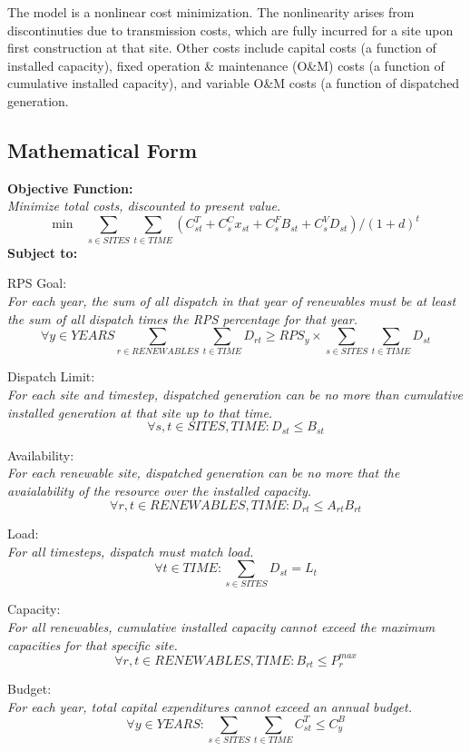 \documentclass[12pt,letterpaper,fleqn]{article}
\begin{document}
The model is a nonlinear cost minimization. The nonlinearity arises
from discontinuties due to transmission costs, which are fully
incurred for a site upon first construction at that site. Other costs
include capital costs (a function of installed capacity), fixed
operation \& maintenance (O\&M) costs (a function of cumulative
installed capacity), and variable O\&M costs (a function of dispatched
generation. 

\subsection{Mathematical Form}

\textbf{Objective Function:}\\
\emph{Minimize total costs, discounted to present value.}
  \[\text{min} \quad  \sum_{s \in SITES}\sum_{t \in TIME}(C_{st}^T + C_s^Cx_{st}
  + C_s^FB_{st} + C_s^VD_{st}) / (1 + d)^t\]
  \textbf{Subject to:}

  RPS Goal:\\
  \emph{For each year, the sum of all dispatch in that year of
    renewables must be at least the sum of all dispatch times the RPS
    percentage for that year.}
  \[\forall y \in YEARS \sum_{r \in RENEWABLES}\sum_{t \in TIME} D_{rt} \ge RPS_y \times
  \sum_{s \in SITES}\sum_{t \in TIME} D_{st}\]

  Dispatch Limit:\\
  \emph{For each site and timestep, dispatched generation can be no
    more than cumulative installed generation at that site up to that
    time.}
  \[\forall s,t \in SITES, TIME: D_{st} \le B_{st}\]

  Availability:\\
  \emph{For each renewable site, dispatched generation can be no more
    that the avaialability of the resource over the installed
    capacity.}
  \[\forall r,t \in RENEWABLES, TIME: D_{rt} \le A_{rt}B_{rt}\]

  Load:\\
  \emph{For all timesteps, dispatch must match load.}
  \[\forall t \in TIME: \sum_{s \in SITES} D_{st} = L_{t}\]

  Capacity:\\
  \emph{For all renewables, cumulative installed capacity cannot
    exceed the maximum capacities for that specific site.}
  \[\forall r,t \in RENEWABLES, TIME: B_{rt} \le P_r^{max}\]

  Budget:\\
  \emph{For each year, total capital expenditures cannot exceed an
    annual budget.}
  \[\forall y \in YEARS: \sum_{s \in SITES}\sum_{t \in TIME} C_{st}^T
  \le C_{y}^B\]
\end{document}
